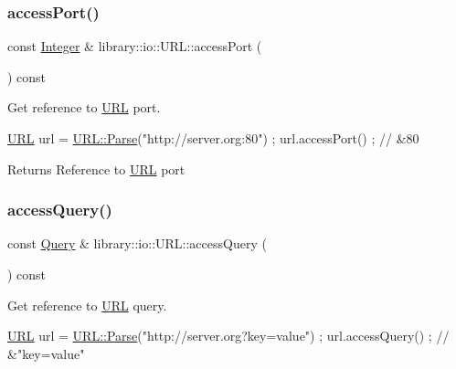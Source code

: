 \subsubsection{\texorpdfstring{access\+Port()}{accessPort()}}
{\footnotesize\ttfamily const \hyperlink{namespacelibrary_1_1io_a0a929bf9e177597c2e92073d200dda53}{Integer} \& library\+::io\+::\+U\+R\+L\+::access\+Port (\begin{DoxyParamCaption}{ }\end{DoxyParamCaption}) const}



Get reference to \hyperlink{classlibrary_1_1io_1_1_u_r_l}{U\+RL} port. 


\begin{DoxyCode}
\hyperlink{classlibrary_1_1io_1_1_u_r_l_a7e9c070138a6dbd000ffb10b7cd8a5c4}{URL} url = \hyperlink{classlibrary_1_1io_1_1_u_r_l_a03a589af0787df20428d4d33e26bb2d7}{URL::Parse}(\textcolor{stringliteral}{"http://server.org:80"}) ;
url.accessPort() ; \textcolor{comment}{// &80}
\end{DoxyCode}


\begin{DoxyReturn}{Returns}
Reference to \hyperlink{classlibrary_1_1io_1_1_u_r_l}{U\+RL} port 
\end{DoxyReturn}
\mbox{\label{classlibrary_1_1io_1_1_u_r_l_ae84d0fcc5b9ed96e6259ddae3472c695}} 
\subsubsection{\texorpdfstring{access\+Query()}{accessQuery()}}
{\footnotesize\ttfamily const \hyperlink{namespacelibrary_1_1io_a39ebaf2265de78ba79eb5347f2af61b3}{Query} \& library\+::io\+::\+U\+R\+L\+::access\+Query (\begin{DoxyParamCaption}{ }\end{DoxyParamCaption}) const}



Get reference to \hyperlink{classlibrary_1_1io_1_1_u_r_l}{U\+RL} query. 


\begin{DoxyCode}
\hyperlink{classlibrary_1_1io_1_1_u_r_l_a7e9c070138a6dbd000ffb10b7cd8a5c4}{URL} url = \hyperlink{classlibrary_1_1io_1_1_u_r_l_a03a589af0787df20428d4d33e26bb2d7}{URL::Parse}(\textcolor{stringliteral}{"http://server.org?key=value"}) ;
url.accessQuery() ; \textcolor{comment}{// &"key=value"}
\end{DoxyCode}



